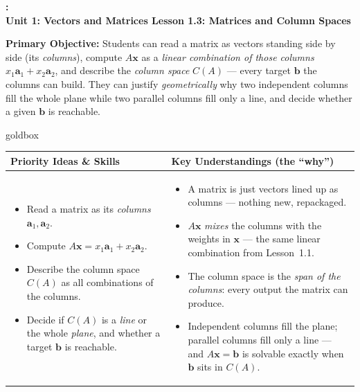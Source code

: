 \documentclass[10pt]{article}
\newcommand{\xx}{\mathbf{x}}
\newcommand{\bb}{\mathbf{b}}
\newcommand{\UnitNumberName}{Unit 1: Vectors and Matrices \quad}
\newcommand{\LessonNumberName}{Lesson 1.3: Matrices and Column Spaces}
\begin{document}
\begin{center}
    {\Large\bfseries \CourseName: \SchoolYear \\
    {\small\bfseries \UnitNumberName \LessonNumberName}}
\end{center}

\begin{tcolorbox}[colback=blush, colframe=burgundy, boxrule=0.9pt, arc=2mm,
    left=2mm, right=2mm, top=1.5mm, bottom=1.5mm]
    \textbf{Primary Objective:} Students can read a matrix as vectors standing side by side
    (its \emph{columns}), compute $A\xx$ as a \emph{linear combination of those columns}
    $x_1\mathbf{a}_1+x_2\mathbf{a}_2$, and describe the \emph{column space} $C(A)$ --- every
    target $\bb$ the columns can build. They can justify \emph{geometrically} why two
    independent columns fill the whole plane while two parallel columns fill only a line, and
    decide whether a given $\bb$ is reachable.
\end{tcolorbox}

\renewcommand{\arraystretch}{1.4}
\begin{skillbox}{goldbox}
\begin{tabularx}{\linewidth}{@{}X|X@{}}
\textbf{Priority Ideas \& Skills} & \textbf{Key Understandings (the ``why'')} \\[2pt]
\hline
\vspace{-6pt}
\begin{itemize}[leftmargin=1.1em, nosep, after=\vspace{2pt}]
  \item Read a matrix as its \emph{columns} $\mathbf{a}_1,\mathbf{a}_2$.
  \item Compute $A\xx = x_1\mathbf{a}_1 + x_2\mathbf{a}_2$.
  \item Describe the column space $C(A)$ as all combinations of the columns.
  \item Decide if $C(A)$ is a \emph{line} or the whole \emph{plane}, and whether a target $\bb$ is reachable.
\end{itemize}
&
\vspace{-6pt}
\begin{itemize}[leftmargin=1.1em, nosep, after=\vspace{2pt}]
  \item A matrix is just vectors lined up as columns --- nothing new, repackaged.
  \item $A\xx$ \emph{mixes} the columns with the weights in $\xx$ --- the same linear combination from Lesson~1.1.
  \item The column space is the \emph{span of the columns}: every output the matrix can produce.
  \item Independent columns fill the plane; parallel columns fill only a line --- and $A\xx=\bb$ is solvable exactly when $\bb$ sits in $C(A)$.
\end{itemize}
\end{tabularx}
\end{skillbox}
\end{document}
